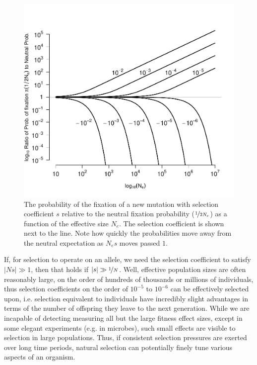 {\begin{figure}
\begin{center}
\includegraphics[width=0.9 \textwidth]{figures/prob_fix_diffusion_var_N.pdf}
\end{center}
\caption{The probability of the fixation of a new mutation with
  selection coefficient $s$ relative to the neutral fixation
  probability ($\nicefrac{1}{2N_e}$) as a function of the effective
  size $N_e$. The selection coefficient is shown next to the
  line. Note how quickly the probabilities move away from the
  neutral expectation as $N_es$ moves passed $1$. } \label{fig:prob_fix_diffusion}
\end{figure}


If, for selection to operate on an allele, we need the selection coefficient to satisfy
$|Ns|\gg 1$, then that holds if $|s|\gg \nicefrac{1}{N}$. 
Well, effective population sizes are often reasonably large, on the
order of hundreds of thousands or millions of individuals, thus selection
coefficients on the order of $10^{-5}$ to $10^{-6}$ can be effectively selected upon, i.e. selection
equivalent to individuals have incredibly slight advantages in terms
of the number of offspring they leave to the next generation.
While we are incapable of detecting measuring all but the large fitness effect sizes,  
except in some elegant experiments (e.g. in microbes), such small effects are visible to
selection in large populations. Thus, if consistent selection pressures are exerted over long
time periods, natural selection can potentially finely tune various aspects of an organism.

}
